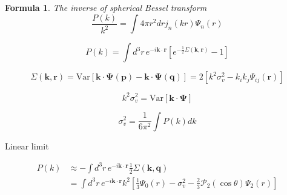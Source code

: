 \documentclass[a4paper,11pt]{article}
\newtheorem{formula}{Formula}[section]
\begin{document}
\begin{formula}
  The inverse of spherical Bessel transform
  \begin{equation}
    \frac{P(k)}{k^2} = \int 4\pi r^2 dr j_n(kr) \Psi_n(r)
  \end{equation}
\end{formula}

\begin{equation}
  P(k) = \int \! d^3 r \, e^{-i\bm{k}\cdot\bm{r}}
                          \left[ e^{-\frac{1}{2} \Sigma(\bm{k}, \bm{r})} - 1 \right]
\end{equation}

\begin{equation}
  \Sigma(\bm{k}, \bm{r}) = \mathrm{Var} \left[
   \bm{k} \cdot \bm{\Psi}(\bm{p}) - \bm{k} \cdot \bm{\Psi}(\bm{q}) \right]
    = 2\left[ k^2 \sigma_v^2 - k_i k_j \Psi_{ij}(\bm{r}) \right]
\end{equation}

\begin{equation}
  k^2 \sigma_v^2 = \textrm{Var}\left[ \bm{k}\cdot\bm{\Psi} \right]
\end{equation}

\begin{equation}
  \sigma_v^2 = \frac{1}{6\pi^2}\int \! P(k) dk
\end{equation}

Linear limit

\begin{align}
  P(k) &\approx - \int \! d^3 r \, e^{-i\bm{k}\cdot\bm{r}}
           \frac{1}{2}\Sigma(\bm{k}, \bm{q})\\
           &= \int\!d^3 r \, e^{-i\bm{k}\cdot\bm{r}}
           k^2 \left[ \frac{1}{3} \Psi_0(r) - \sigma_v^2
                 - \frac{2}{3} \mathcal{P}_2(\cos\theta) \Psi_2(r) \right]
\end{align}



\label{LastPage}
\end{document}
